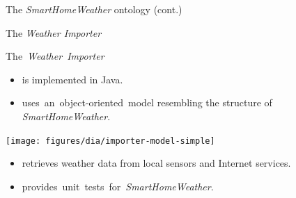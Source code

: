 \documentclass[final,hyperref={pdfpagelabels=true}]{beamer}
\begin{document}
\begin{frame}[fragile]
\begin{columns}[t]
\begin{column}{.45\textwidth}
\begin{block}{The \emph{SmartHomeWeather} ontology (cont.)}
	\vspace{10mm}
      \end{block}
      
      \begin{block}{The \emph{Weather Importer}}
        \begin{minipage}{\dimexpr.49\textwidth}
	  \mbox{The \emph{Weather Importer}}

	  \hspace{-.84em}\begin{minipage}{\dimexpr\textwidth+.84em}
	    \vspace{.4em}
	    \begin{itemize}
	      \item is implemented in Java.
	      \item \mbox{uses an object-oriented model} resembling the structure of \emph{SmartHomeWeather}.
	    \end{itemize}
	  \end{minipage}
	\end{minipage}
	\begin{minipage}{\dimexpr.41\textwidth}
	  \centering
  	  \texttt{[image: figures/dia/importer-model-simple]}
	\end{minipage}

	\vspace{.3em}
	
	\begin{itemize}
	  \item retrieves weather data from local sensors and Internet services.
	  \item \mbox{provides unit tests for \emph{SmartHomeWeather}.}
	\end{itemize}
      \end{block}


\end{column}
\end{columns}
\end{frame}
\end{document}
